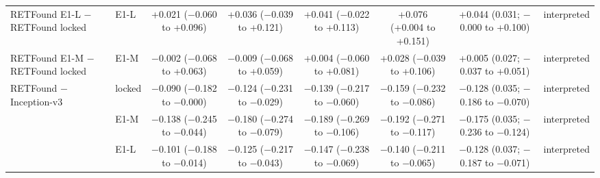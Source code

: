 \begin{longtable}{@{}p{3.6cm}lcccccp{2.6cm}@{}}
\addlinespace[2pt]
RETFound E1-L $-$ RETFound locked & E1-L & \makecell{+0.021\\{\scriptsize ($-$0.060 to +0.096)}} & \makecell{+0.036\\{\scriptsize ($-$0.039 to +0.121)}} & \makecell{+0.041\\{\scriptsize ($-$0.022 to +0.113)}} & \makecell{+0.076\\{\scriptsize (+0.004 to +0.151)}} & \makecell{+0.044\\{\scriptsize (0.031; $-$0.000 to +0.100)}} & interpreted \\
\addlinespace[2pt]
RETFound E1-M $-$ RETFound locked & E1-M & \makecell{$-$0.002\\{\scriptsize ($-$0.068 to +0.063)}} & \makecell{$-$0.009\\{\scriptsize ($-$0.068 to +0.059)}} & \makecell{+0.004\\{\scriptsize ($-$0.060 to +0.081)}} & \makecell{+0.028\\{\scriptsize ($-$0.039 to +0.106)}} & \makecell{+0.005\\{\scriptsize (0.027; $-$0.037 to +0.051)}} & interpreted \\
\addlinespace[2pt]
RETFound $-$ Inception-v3 & locked & \makecell{$-$0.090\\{\scriptsize ($-$0.182 to $-$0.000)}} & \makecell{$-$0.124\\{\scriptsize ($-$0.231 to $-$0.029)}} & \makecell{$-$0.139\\{\scriptsize ($-$0.217 to $-$0.060)}} & \makecell{$-$0.159\\{\scriptsize ($-$0.232 to $-$0.086)}} & \makecell{$-$0.128\\{\scriptsize (0.035; $-$0.186 to $-$0.070)}} & interpreted \\
 & E1-M & \makecell{$-$0.138\\{\scriptsize ($-$0.245 to $-$0.044)}} & \makecell{$-$0.180\\{\scriptsize ($-$0.274 to $-$0.079)}} & \makecell{$-$0.189\\{\scriptsize ($-$0.269 to $-$0.106)}} & \makecell{$-$0.192\\{\scriptsize ($-$0.271 to $-$0.117)}} & \makecell{$-$0.175\\{\scriptsize (0.035; $-$0.236 to $-$0.124)}} & interpreted \\
 & E1-L & \makecell{$-$0.101\\{\scriptsize ($-$0.188 to $-$0.014)}} & \makecell{$-$0.125\\{\scriptsize ($-$0.217 to $-$0.043)}} & \makecell{$-$0.147\\{\scriptsize ($-$0.238 to $-$0.069)}} & \makecell{$-$0.140\\{\scriptsize ($-$0.211 to $-$0.065)}} & \makecell{$-$0.128\\{\scriptsize (0.037; $-$0.187 to $-$0.071)}} & interpreted \\

\end{longtable}
